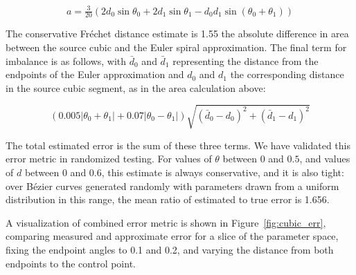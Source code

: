 \documentclass[sigconf]{acmart}
\begin{document}
\[
    a = \tfrac{3}{20}(2d_0\sin \theta_0 + 2d_1\sin \theta_1 - d_0 d_1\sin(\theta_0+\theta_1))
\]

The conservative Fréchet distance estimate is 1.55 the absolute difference in area between the source cubic and the Euler spiral approximation. The final term for imbalance is as follows, with $\bar{d}_0$ and $\bar{d}_1$ representing the distance from the endpoints of the Euler approximation and $d_0$ and $d_1$ the corresponding distance in the source cubic segment, as in the area calculation above:

\[
    (0.005|\theta_0+\theta_1| + 0.07|\theta_0 - \theta_1|)\sqrt{(\bar{d}_0 - d_0)^2 + (\bar{d}_1 - d_1)^2}
\]

The total estimated error is the sum of these three terms. We have validated this error metric in randomized testing. For values of $\theta$ between $0$ and $0.5$, and values of $d$ between $0$ and $0.6$, this estimate is always conservative, and it is also tight: over Bézier curves generated randomly with parameters drawn from a uniform distribution in this range, the mean ratio of estimated to true error is 1.656.

A visualization of combined error metric is shown in Figure~\ref{fig:cubic_err}, comparing measured and approximate error for a slice of the parameter space, fixing the endpoint angles to 0.1 and 0.2, and varying the distance from both endpoints to the control point.
\end{document}
